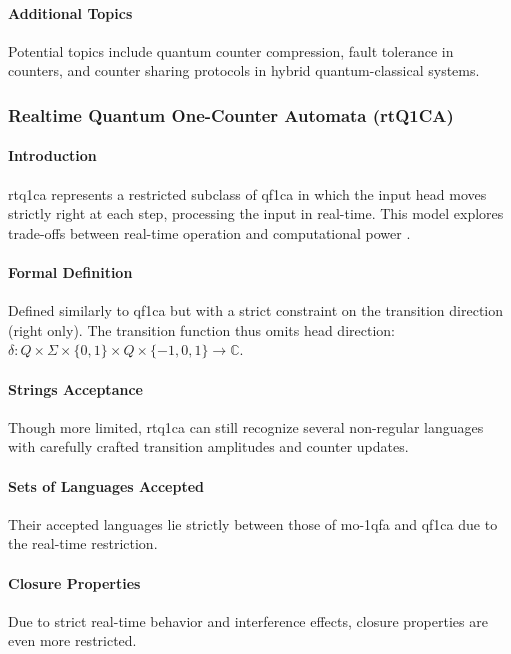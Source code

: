 \paragraph{Additional Topics}
Potential topics include quantum counter compression, fault tolerance in counters, and counter sharing protocols in hybrid quantum-classical systems.

\subsubsection{Realtime Quantum One-Counter Automata (rtQ1CA)}

\paragraph{Introduction}
\gls{rtq1ca} represents a restricted subclass of \gls{qf1ca} in which the input head moves strictly right at each step, processing the input in real-time. This model explores trade-offs between real-time operation and computational power \cite{cem2012quantum}.

\paragraph{Formal Definition}
Defined similarly to \gls{qf1ca} but with a strict constraint on the transition direction (right only). The transition function thus omits head direction: $\delta: Q \times \Sigma \times \{0,1\} \times Q \times \{-1,0,1\} \rightarrow \mathbb{C}$.

\paragraph{Strings Acceptance}
Though more limited, \gls{rtq1ca} can still recognize several non-regular languages with carefully crafted transition amplitudes and counter updates.

\paragraph{Sets of Languages Accepted}
Their accepted languages lie strictly between those of \gls{mo-1qfa} and \gls{qf1ca} due to the real-time restriction.

\paragraph{Closure Properties}
Due to strict real-time behavior and interference effects, closure properties are even more restricted.

